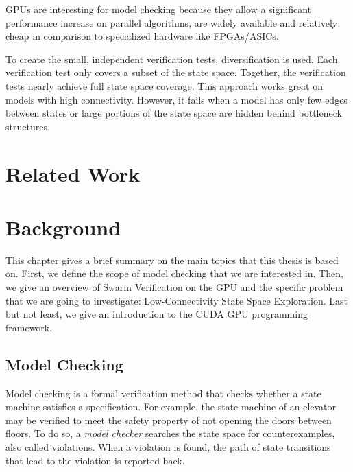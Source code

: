 \documentclass[
fancyheadings, %
%
%
]{stsreprt}
\begin{document}
GPUs are interesting for model checking because they allow a significant performance increase on parallel algorithms, are widely available and relatively cheap in comparison to specialized hardware like FPGAs/ASICs.


To create the small, independent verification tests, diversification is used.
Each verification test only covers a subset of the state space.
Together, the verification tests nearly achieve full state space coverage.
This approach works great on models with high connectivity.
However, it fails when a model has only few edges between states or large portions of the state space are hidden behind bottleneck structures.

\chapter{Related Work}

\chapter{Background}

This chapter gives a brief summary on the main topics that this thesis is based on.
First, we define the scope of model checking that we are interested in.
Then, we give an overview of Swarm Verification on the GPU and the specific problem that we are going to investigate: Low-Connectivity State Space Exploration.
Last but not least, we give an introduction to the CUDA GPU programming framework.

\section{Model Checking}

Model checking is a formal verification method that checks whether a state machine satisfies a specification.
For example, the state machine of an elevator may be verified to meet the safety property of not opening the doors between floors.
To do so, a \emph{model checker} searches the state space for counterexamples, also called violations.
When a violation is found, the path of state transitions that lead to the violation is reported back.
\end{document}
